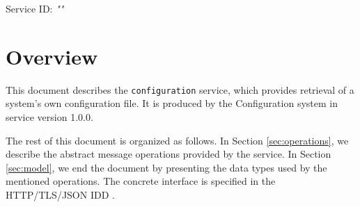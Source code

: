 \documentclass[a4paper]{arrowhead}
\begin{document}
\sloppy

\ArrowheadSetup

\begin{center}
  \vspace*{1cm}
  \huge{\arrowtitle}

  \vspace*{0.2cm}
  \LARGE{\arrowtype}
  \vspace*{1cm}

  \Large{Service ID: \textit{"\arrowid"}}

  \vspace*{\fill}


  \vspace*{1cm}
  \vspace*{\fill}

  \begin{abstract}
    This document describes the \texttt{configuration} service, version 1.0.0, produced by the Configuration support system of Arrowhead 5.2.2.
  \end{abstract}

  \vspace*{1cm}
\end{center}

\newpage

\tableofcontents
\newpage

\section{Overview}
\label{sec:overview}

This document describes the \texttt{configuration} service, which provides retrieval of a system's own configuration file.
It is produced by the Configuration system \cite{cfg-sysd} in service version 1.0.0.

The rest of this document is organized as follows.
In Section \ref{sec:operations}, we describe the abstract message operations provided by the service.
In Section \ref{sec:model}, we end the document by presenting the data types used by the mentioned operations.
The concrete interface is specified in the HTTP/TLS/JSON IDD \cite{cfg-configuration-http-idd}.
\end{document}
